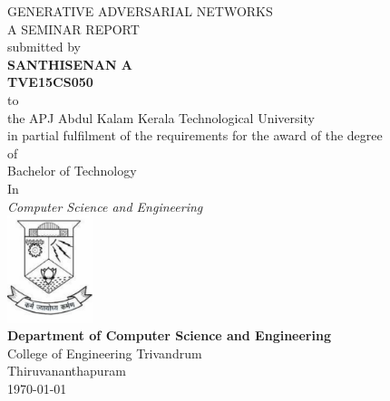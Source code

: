 \begin{titlepage}
        \newcommand{\HRule}{\rule{\linewidth}{0.5mm}}
        \begin{center}
            {\LARGE{GENERATIVE ADVERSARIAL NETWORKS}}\\[0.75cm]
            \large{A SEMINAR REPORT} \\[0.75cm]
            submitted by \\ [0.75cm]
            \textbf{\Large{SANTHISENAN A}} \\[0.25cm]
            \textbf{\large{TVE15CS050}} \\[0.75cm]
            to\\
            {the APJ Abdul Kalam Kerala Technological University \\[0.25cm] 
            in partial fulfilment of the requirements for the award of the degree}\\[0.75cm]
            of\\[0.75cm]
            {\large Bachelor of Technology}\\
            In\\
            \textit{\large Computer Science and Engineering}\\[0.75cm]
            \includegraphics[width=2.5cm]{images/emblem.pdf}\\[1cm]

            \textbf{\Large{Department of Computer Science and Engineering}}\\
            [0.75cm]
            {College of Engineering Trivandrum}\\
            Thiruvananthapuram\\[0.75cm]
            \textsc{\Large{\monthyeardate\today}}
        \end{center}
\end{titlepage}